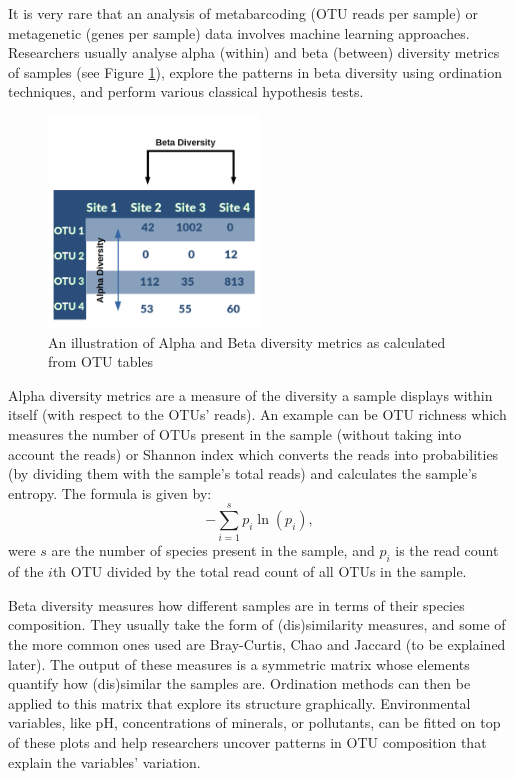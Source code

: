 It is very rare that an analysis of metabarcoding (OTU reads per sample) or metagenetic (genes per sample) data involves machine learning approaches. Researchers usually analyse alpha (within) and beta (between) diversity metrics of samples (see Figure \ref{fig:otu}), explore the patterns in beta diversity using ordination techniques, and perform various classical hypothesis tests. 

\begin{figure}
	\centering
	\includegraphics[width=0.5\textwidth]{otutable}
	\caption{An illustration of Alpha and Beta diversity metrics as calculated from OTU tables}
	\label{fig:otu}
\end{figure}

Alpha diversity metrics are a measure of the diversity a sample displays within itself (with respect to the OTUs' reads). An example can be OTU richness which measures the number of OTUs present in the sample (without taking into account the reads) or Shannon index which converts the reads into probabilities (by dividing them with the sample's total reads) and calculates the sample's entropy. The formula is given by:
$$-\sum_{i=1}^s p_i \ln(p_i),$$
were $s$ are the number of species present in the sample, and $p_i$ is the read count of the $i$th OTU divided by the total read count of all OTUs in the sample. 

Beta diversity measures how different samples are in terms of their species composition. They usually take the form of (dis)similarity measures, and some of the more common ones used are Bray-Curtis, Chao and Jaccard (to be explained later). The output of these measures is a symmetric matrix whose elements quantify how (dis)similar the samples are. Ordination methods can then be applied to this matrix that explore its structure graphically. Environmental variables, like pH, concentrations of minerals, or pollutants, can be fitted on top of these plots and help researchers uncover patterns in OTU composition that explain the variables' variation.

